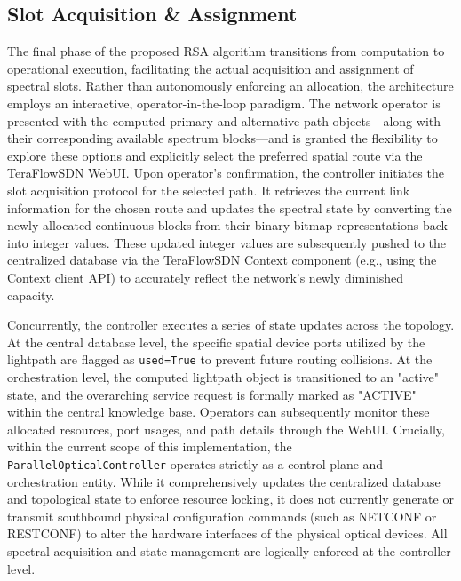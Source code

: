 \subsection{Slot Acquisition \& Assignment}
The final phase of the proposed RSA algorithm transitions from computation to operational execution, facilitating the actual acquisition and assignment of spectral slots. Rather than autonomously enforcing an allocation, the architecture employs an interactive, operator-in-the-loop paradigm. The network operator is presented with the computed primary and alternative path objects—along with their corresponding available spectrum blocks—and is granted the flexibility to explore these options and explicitly select the preferred spatial route via the TeraFlowSDN WebUI. Upon operator's confirmation, the controller initiates the slot acquisition protocol for the selected path. It retrieves the current link information for the chosen route and updates the spectral state by converting the newly allocated continuous blocks from their binary bitmap representations back into integer values. These updated integer values are subsequently pushed to the centralized database via the TeraFlowSDN Context component (e.g., using the Context client API) to accurately reflect the network's newly diminished capacity.

Concurrently, the controller executes a series of state updates across the topology. At the central database level, the specific spatial device ports utilized by the lightpath are flagged as \texttt{used=True} to prevent future routing collisions. At the orchestration level, the computed lightpath object is transitioned to an "active" state, and the overarching service request is formally marked as "ACTIVE" within the central knowledge base. Operators can subsequently monitor these allocated resources, port usages, and path details through the WebUI. Crucially, within the current scope of this implementation, the \texttt{ParallelOpticalController} operates strictly as a control-plane and orchestration entity. While it comprehensively updates the centralized database and topological state to enforce resource locking, it does not currently generate or transmit southbound physical configuration commands (such as NETCONF or RESTCONF) to alter the hardware interfaces of the physical optical devices. All spectral acquisition and state management are logically enforced at the controller level.

